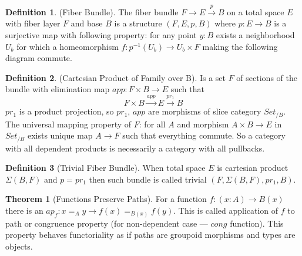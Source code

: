 \documentclass{article}
\theoremstyle{definition}
\newtheorem{definition}{Definition}
\newtheorem{theorem}{Theorem}
\begin{document}
\begin{definition} (Fiber Bundle).
The fiber bundle $ F \rightarrow E \xrightarrow{p} B$ on a total space $E$ with fiber layer $F$ and base $B$ is a
structure $(F,E,p,B)$ where $p: E \rightarrow B$ is a surjective map with following property:
for any point $y: B$ exists a neighborhood $U_b$ for which a homeomorphism $f: p^{-1}(U_b) \rightarrow U_b \times F$
making the following diagram commute.
\begin{center}
\end{center}
\end{definition}

\begin{definition} (Cartesian Product of Family over B).
Is a set $F$ of sections of the bundle with elimination map $app : F \times B \rightarrow E$ such that
\begin{equation}
F \times B \xrightarrow{app} E \xrightarrow{pr_1} B
\end{equation}
$pr_1$ is a product projection, so $pr_1$, $app$ are morphisms
of slice category $Set_{/B}$. The universal mapping property of $F$:
for all $A$ and morphism $A \times B \rightarrow E$ in $Set_{/B}$ exists
unique map $A \rightarrow F$ such that everything commute. So a category
with all dependent products is necessarily a category with all pullbacks.
\end{definition}

\begin{definition}[Trivial Fiber Bundle]
When total space $E$ is cartesian product $\Sigma(B,F)$ and $p = pr_1$
then such bundle is called trivial $(F,\Sigma(B,F),pr_1,B)$.
\end{definition}

\begin{theorem}[Functions Preserve Paths]
For a function $f: (x:A) \rightarrow B(x)$
there is an $ap_f : x =_A y \rightarrow f(x) =_{B(x)} f(y)$. This is called
application of $f$ to path or congruence property (for non-dependent case ---
$cong$ function). This property behaves functoriality
as if paths are groupoid morphisms and types are objects.
\end{theorem}
\end{document}
